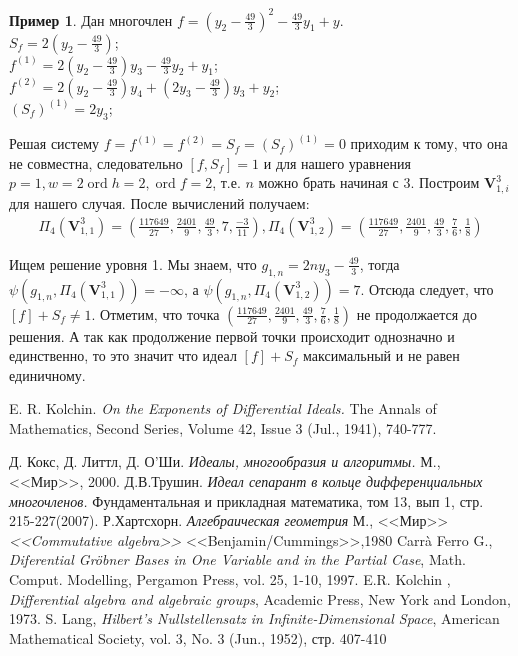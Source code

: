 \documentclass[16pt]{article}
\DeclareMathOperator{\ord}{ord}
\theoremstyle{plain1}
\theoremstyle{plain2}
\theoremstyle{plain}
\theoremstyle{plain3}
\theoremstyle{definition}
\newtheorem{example}[theorem3]{Пример}
\theoremstyle{remark}
\begin{document}
\begin{example}
Дан многочлен $f=(y_2-\frac{49}{3})^2-\frac{49}{3}y_1+y$.
\\
$S_f=2(y_2-\frac{49}{3})$;
\\
$f^{(1)}=2(y_2-\frac{49}{3})y_3-\frac{49}{3}y_2+y_1$;
\\
$f^{(2)}=2(y_2-\frac{49}{3})y_4+(2y_3-\frac{49}{3})y_3+y_2$;
\\
$(S_f)^{(1)}=2y_3$;

Решая систему $f=f^{(1)}=f^{(2)}=S_f=(S_f)^{(1)}=0$ приходим к тому,
что она не совместна, следовательно $[f,S_f]=1$ и  для нашего
уравнения $p=1,w=2\ord{h}=2,\ord{f}=2$, т.е. $n$  можно брать начиная с $3$. Построим $\mathbf{V}_{1,i}^3$ для нашего случая. После вычислений получаем: 
\begin{gather*}
\Pi_{4}(\mathbf{V}_{1,1}^3)=\left(\frac{117649}{27},\frac{2401}{9},\frac{49}{3},7,\frac{-3}{11}\right),
\Pi_{4}(\mathbf{V}_{1,2}^3)=\left(\frac{117649}{27},\frac{2401}{9},\frac{49}{3},\frac{7}{6},\frac{1}{8}\right)
\end{gather*}

Ищем решение уровня 1. Мы знаем, что $g_{1,n}=2ny_3-\frac{49}{3}$, тогда $\psi(g_{1,n},\Pi_{4}(\mathbf{V}_{1,1}^3))=-\infty$, а $\psi(g_{1,n},\Pi_{4}(\mathbf{V}_{1,2}^3))=7$. Отсюда следует, что $[f]+S_f\not=1$. Отметим, что точка $\left(\frac{117649}{27},\frac{2401}{9},\frac{49}{3},\frac{7}{6},\frac{1}{8}\right)$ не продолжается до решения.  А так как продолжение первой точки происходит однозначно и единственно, то это значит что идеал $[f]+S_f$ максимальный и не равен единичному.


\end{example}







\begin{thebibliography}{99}

E. R. Kolchin.
\emph{On the Exponents of Differential Ideals.}
The Annals of Mathematics, Second Series, Volume 42, Issue 3 (Jul., 1941), 740-777.

Д. Кокс, Д. Литтл, Д. О'Ши.
\emph{Идеалы, многообразия и алгоритмы.}
М., <<Мир>>, 2000.
Д.В.Трушин.
\emph{Идеал сепарант в кольце дифференциальных многочленов.}
Фундаментальная и прикладная математика, том 13, вып 1, стр. 215-227(2007).
Р.Хартсхорн.
\emph{Алгебраическая геометрия}
М., <<Мир>>
\emph{<<Commutative algebra>>}
<<Benjamin/Cummings>>,1980
Carr\`a Ferro G.,
\emph{Diferential Gr\"{o}bner Bases in One Variable and in the Partial Case},
Math. Comput. Modelling, Pergamon Press, vol. 25, 1-10, 1997.
E.R. Kolchin ,
\emph{ Differential algebra and algebraic groups}, Academic Press, New York and London, 1973.
S. Lang,
\emph{ Hilbert's Nullstellensatz in Infinite-Dimensional Space}, American Mathematical Society, vol. 3, No. 3 (Jun., 1952), стр. 407-410
\end{thebibliography}
\end{document}
